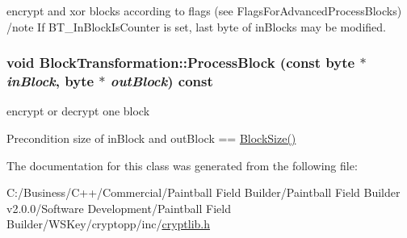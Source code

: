encrypt and xor blocks according to flags (see FlagsForAdvancedProcessBlocks) /note If BT\_\-InBlockIsCounter is set, last byte of inBlocks may be modified. \hypertarget{class_block_transformation_a2fefb3f4c6c6297c0c91fcbba9e4f4f3}{
\subsubsection[{ProcessBlock}]{\setlength{\rightskip}{0pt plus 5cm}void BlockTransformation::ProcessBlock (const byte $\ast$ {\em inBlock}, \/  byte $\ast$ {\em outBlock}) const}}
\label{class_block_transformation_a2fefb3f4c6c6297c0c91fcbba9e4f4f3}


encrypt or decrypt one block \begin{DoxyPrecond}{Precondition}
size of inBlock and outBlock == \hyperlink{class_block_transformation_adfdb78b033996020435c3dcffdca76ce}{BlockSize()} 
\end{DoxyPrecond}


The documentation for this class was generated from the following file:\begin{DoxyCompactItemize}
\item 
C:/Business/C++/Commercial/Paintball Field Builder/Paintball Field Builder v2.0.0/Software Development/Paintball Field Builder/WSKey/cryptopp/inc/\hyperlink{cryptlib_8h}{cryptlib.h}\end{DoxyCompactItemize}
